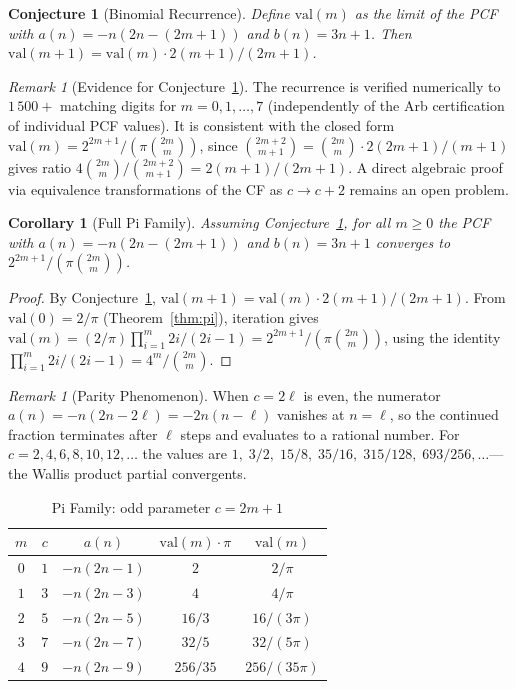 \documentclass[11pt,a4paper]{article}
\theoremstyle{plain}
\newtheorem{corollary}[theorem]{Corollary}
\newtheorem{conjecture}[theorem]{Conjecture}
\theoremstyle{remark}
\newtheorem{remark}[theorem]{Remark}
\begin{document}
\begin{conjecture}[Binomial Recurrence]\label{conj:rec}
Define $\mathrm{val}(m)$ as the limit of the PCF with
$a(n) = -n(2n{-}(2m{+}1))$ and $b(n) = 3n{+}1$.
Then $\mathrm{val}(m{+}1) = \mathrm{val}(m)\cdot 2(m{+}1)/(2m{+}1)$.
\end{conjecture}
\begin{remark}[Evidence for Conjecture~\ref{conj:rec}]
The recurrence is verified numerically to $1\,500{+}$ matching digits
for $m = 0,1,\ldots,7$ (independently of the Arb certification of
individual PCF values).  It is consistent with the closed form
$\mathrm{val}(m) = 2^{2m+1}/(\pi\binom{2m}{m})$, since
$\binom{2m+2}{m+1} = \binom{2m}{m}\cdot 2(2m{+}1)/(m{+}1)$ gives
ratio $4\binom{2m}{m}/\binom{2m+2}{m+1} = 2(m{+}1)/(2m{+}1)$.
A direct algebraic proof via equivalence transformations
of the CF as $c \to c{+}2$ remains an open problem.
\end{remark}

\begin{corollary}[Full Pi Family]\label{cor:pi}
Assuming Conjecture~\ref{conj:rec}, for all $m \ge 0$ the PCF with
$a(n) = -n(2n{-}(2m{+}1))$ and $b(n) = 3n+1$ converges to
$2^{2m+1}/(\pi\binom{2m}{m})$.
\end{corollary}
\begin{proof}
By Conjecture~\ref{conj:rec},
$\mathrm{val}(m{+}1) = \mathrm{val}(m)\cdot 2(m{+}1)/(2m{+}1)$.
From $\mathrm{val}(0) = 2/\pi$ (Theorem~\ref{thm:pi}), iteration gives
$\mathrm{val}(m) = (2/\pi)\prod_{i=1}^m 2i/(2i{-}1) = 2^{2m+1}/(\pi\binom{2m}{m})$,
using the identity $\prod_{i=1}^m 2i/(2i{-}1) = 4^m/\binom{2m}{m}$.
\end{proof}

\begin{remark}[Parity Phenomenon]\label{rem:parity}
When $c = 2\ell$ is even, the numerator $a(n) = -n(2n{-}2\ell) = -2n(n{-}\ell)$
vanishes at $n = \ell$, so the continued fraction terminates
after $\ell$ steps and evaluates to a rational number.
For $c = 2,4,6,8,10,12,\ldots$ the values are
$1,\;3/2,\;15/8,\;35/16,\;315/128,\;693/256,\ldots$---the
Wallis product partial convergents.
\end{remark}

\begin{table}[h]
\centering
\caption{Pi Family: odd parameter $c = 2m{+}1$}\label{tab:pi}
\begin{tabular}{@{}ccccc@{}}
\toprule
$m$ & $c$ & $a(n)$ & $\mathrm{val}(m)\cdot\pi$ & $\mathrm{val}(m)$ \\
\midrule
$0$ & $1$ & $-n(2n{-}1)$ & $2$ & $2/\pi$ \\
$1$ & $3$ & $-n(2n{-}3)$ & $4$ & $4/\pi$ \\
$2$ & $5$ & $-n(2n{-}5)$ & $16/3$ & $16/(3\pi)$ \\
$3$ & $7$ & $-n(2n{-}7)$ & $32/5$ & $32/(5\pi)$ \\
$4$ & $9$ & $-n(2n{-}9)$ & $256/35$ & $256/(35\pi)$ \\
\bottomrule
\end{tabular}
\end{table}
\end{document}
